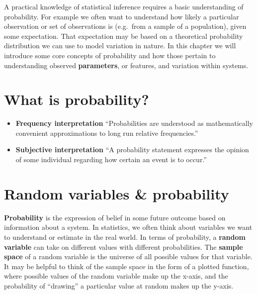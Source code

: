 \documentclass[]{book}
\providecommand{\tightlist}{%
  \setlength{\itemsep}{0pt}\setlength{\parskip}{0pt}}
\begin{document}
A practical knowledge of statistical inference requires a basic understanding of probability. For example we often want to understand how likely a particular observation or set of observations is (e.g.~from a sample of a population), given some expectation. That expectation may be based on a theoretical probability distribution we can use to model variation in nature. In this chapter we will introduce some core concepts of probability and how those pertain to understanding observed \textbf{parameters}, or features, and variation within systems.

\hypertarget{what-is-probability}{%
\section{What is probability?}\label{what-is-probability}}

\begin{itemize}
\tightlist
\item
  \textbf{Frequency interpretation}
  ``Probabilities are understood as mathematically convenient approximations to long run relative frequencies.''
\item
  \textbf{Subjective interpretation}
  ``A probability statement expresses the opinion of some individual regarding how certain an event is to occur.''
\end{itemize}

\hypertarget{random-variables-probability}{%
\section{Random variables \& probability}\label{random-variables-probability}}

\textbf{Probability} is the expression of belief in some future outcome based on information about a system. In statistics, we often think about variables we want to understand or estimate in the real world. In terms of probability, a \textbf{random variable} can take on different values with different probabilities. The \textbf{sample space} of a random variable is the universe of all possible values for that variable. It may be helpful to think of the sample space in the form of a plotted function, where possible values of the random variable make up the x-axis, and the probability of ``drawing'' a particular value at random makes up the y-axis.
\end{document}

